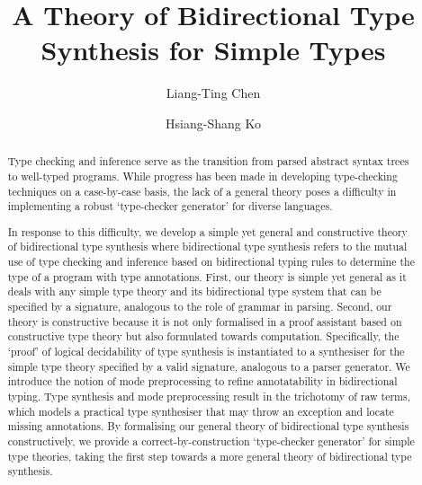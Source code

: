 \documentclass[acmsmall,screen]{acmart}
\theoremstyle{acmdefinition}
\begin{document}
\author{Liang-Ting Chen}
\author{Hsiang-Shang Ko}

\title{A Theory of Bidirectional Type Synthesis for Simple Types}

\begin{abstract}
  Type checking and inference serve as the transition from parsed abstract syntax trees to well-typed programs.
  While progress has been made in developing type-checking techniques on a case-by-case basis, the lack of a general theory poses a difficulty in implementing a robust `type-checker generator' for diverse languages.

  In response to this difficulty, we develop a simple yet general and constructive theory of bidirectional type synthesis where bidirectional type synthesis refers to the mutual use of type checking and inference based on bidirectional typing rules to determine the type of a program with type annotations.
  First, our theory is simple yet general as it deals with any simple type theory and its bidirectional type system that can be specified by a signature, analogous to the role of grammar in parsing.
  Second, our theory is constructive because it is not only formalised in a proof assistant based on constructive type theory but also formulated towards computation.
  Specifically, the `proof' of logical decidability of type synthesis is instantiated to a synthesiser for the simple type theory specified by a valid signature, analogous to a parser generator.
  We introduce the notion of mode preprocessing to refine annotatability in bidirectional typing.
  Type synthesis and mode preprocessing result in the trichotomy of raw terms, which models a practical type synthesiser that may throw an exception and locate missing annotations.
  By formalising our general theory of bidirectional type synthesis constructively, we provide a correct-by-construction `type-checker generator' for simple type theories, taking the first step towards a more general theory of bidirectional type synthesis.
\end{abstract}
\end{document}
